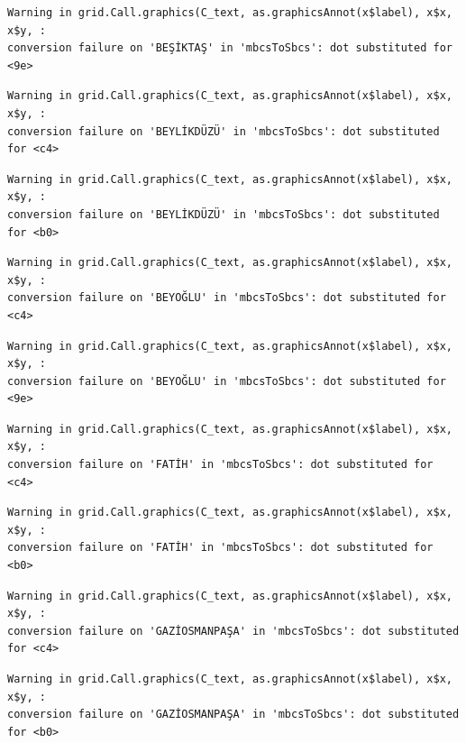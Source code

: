 \documentclass[
  11pt,
  a4paper,
  DIV=11,
  numbers=noendperiod]{scrartcl}
\begin{document}
\begin{verbatim}
Warning in grid.Call.graphics(C_text, as.graphicsAnnot(x$label), x$x, x$y, :
conversion failure on 'BEŞİKTAŞ' in 'mbcsToSbcs': dot substituted for <9e>
\end{verbatim}

\begin{verbatim}
Warning in grid.Call.graphics(C_text, as.graphicsAnnot(x$label), x$x, x$y, :
conversion failure on 'BEYLİKDÜZÜ' in 'mbcsToSbcs': dot substituted for <c4>
\end{verbatim}

\begin{verbatim}
Warning in grid.Call.graphics(C_text, as.graphicsAnnot(x$label), x$x, x$y, :
conversion failure on 'BEYLİKDÜZÜ' in 'mbcsToSbcs': dot substituted for <b0>
\end{verbatim}

\begin{verbatim}
Warning in grid.Call.graphics(C_text, as.graphicsAnnot(x$label), x$x, x$y, :
conversion failure on 'BEYOĞLU' in 'mbcsToSbcs': dot substituted for <c4>
\end{verbatim}

\begin{verbatim}
Warning in grid.Call.graphics(C_text, as.graphicsAnnot(x$label), x$x, x$y, :
conversion failure on 'BEYOĞLU' in 'mbcsToSbcs': dot substituted for <9e>
\end{verbatim}

\begin{verbatim}
Warning in grid.Call.graphics(C_text, as.graphicsAnnot(x$label), x$x, x$y, :
conversion failure on 'FATİH' in 'mbcsToSbcs': dot substituted for <c4>
\end{verbatim}

\begin{verbatim}
Warning in grid.Call.graphics(C_text, as.graphicsAnnot(x$label), x$x, x$y, :
conversion failure on 'FATİH' in 'mbcsToSbcs': dot substituted for <b0>
\end{verbatim}

\begin{verbatim}
Warning in grid.Call.graphics(C_text, as.graphicsAnnot(x$label), x$x, x$y, :
conversion failure on 'GAZİOSMANPAŞA' in 'mbcsToSbcs': dot substituted for <c4>
\end{verbatim}

\begin{verbatim}
Warning in grid.Call.graphics(C_text, as.graphicsAnnot(x$label), x$x, x$y, :
conversion failure on 'GAZİOSMANPAŞA' in 'mbcsToSbcs': dot substituted for <b0>
\end{verbatim}
\end{document}

